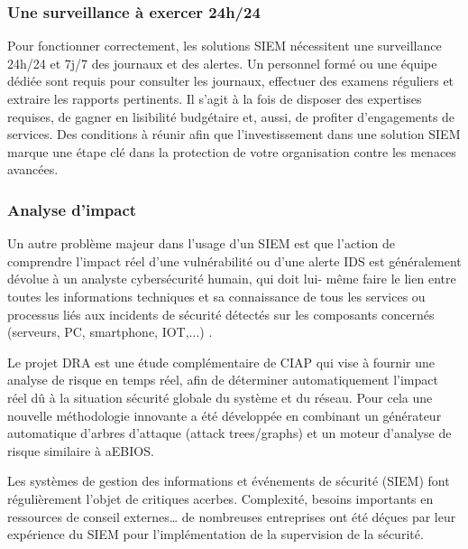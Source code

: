 \subsubsection{Une surveillance à exercer 24h/24}

Pour fonctionner correctement, les solutions SIEM nécessitent une surveillance 24h/24 et 7j/7 des journaux et des alertes. Un personnel formé ou une équipe dédiée sont requis pour consulter les journaux, effectuer des examens réguliers et extraire les rapports pertinents.  
 Il s’agit à la fois de disposer des expertises requises, de gagner en lisibilité budgétaire et, aussi, de profiter d’engagements de services. Des conditions à réunir afin que l’investissement dans une solution SIEM marque une étape clé dans la protection de votre organisation contre les menaces avancées.

\subsubsection{Analyse d'impact}


Un autre problème majeur dans l'usage d'un SIEM est que l'action de comprendre l’impact réel d’une vulnérabilité ou d’une alerte IDS est généralement dévolue à un analyste cybersécurité humain, qui doit lui- même faire le lien entre toutes les informations techniques et sa connaissance de tous les services ou processus liés aux incidents de sécurité détectés sur les composants concernés (serveurs, PC, smartphone, IOT,...) . 

Le projet DRA est une étude complémentaire de CIAP qui vise à fournir une analyse de risque en temps réel, afin de déterminer automatiquement l’impact réel dû à la situation sécurité globale du système et du réseau. Pour cela une nouvelle méthodologie innovante a été développée en combinant un générateur automatique d’arbres d’attaque (attack trees/graphs) et un moteur d’analyse de risque   similaire à \gls{aEBIOS}.

Les systèmes de gestion des informations et événements de sécurité (SIEM) font régulièrement l’objet de critiques acerbes. Complexité, besoins importants en ressources de conseil externes… de nombreuses entreprises ont été déçues par leur expérience du SIEM pour l’implémentation de la supervision de la sécurité.

